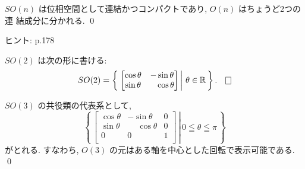 \documentclass[12pt,twoside]{jarticle}
\def\R{{\Bbb R}} %
\begin{document}
\begin{question}
  $SO(n)$ は位相空間として連結かつコンパクトであり, $O(n)$ はちょうど2つの連
  結成分に分かれる. \qed
\end{question}

\noindent ヒント: \cite{Satake} p.178

\begin{question}
  $SO(2)$ は次の形に書ける:
  \begin{equation*}
    SO(2) = 
    \left\{\,
      \left.
      \begin{bmatrix}
        \cos\theta &          - \sin\theta \\
        \sin\theta & \phantom{-}\cos\theta \\
      \end{bmatrix}
      \,\right|\,
        \theta\in\R
    \,\right\}.
    \qed
  \end{equation*}
\end{question}

\begin{question}
  $SO(3)$ の共役類の代表系として, 
  \begin{equation*}
    \left\{\,
      \left.
      \begin{bmatrix}
        \cos\theta &          - \sin\theta & 0 \\
        \sin\theta & \phantom{-}\cos\theta & 0 \\
                 0 &                     0 & 1 \\
      \end{bmatrix}
      \,\right|\,
        0\leqq \theta \leqq \pi
    \,\right\}
  \end{equation*}
  がとれる. すなわち, $O(3)$ の元はある軸を中心とした回転で表示可能である.
  \qed
\end{question}
\end{document}
